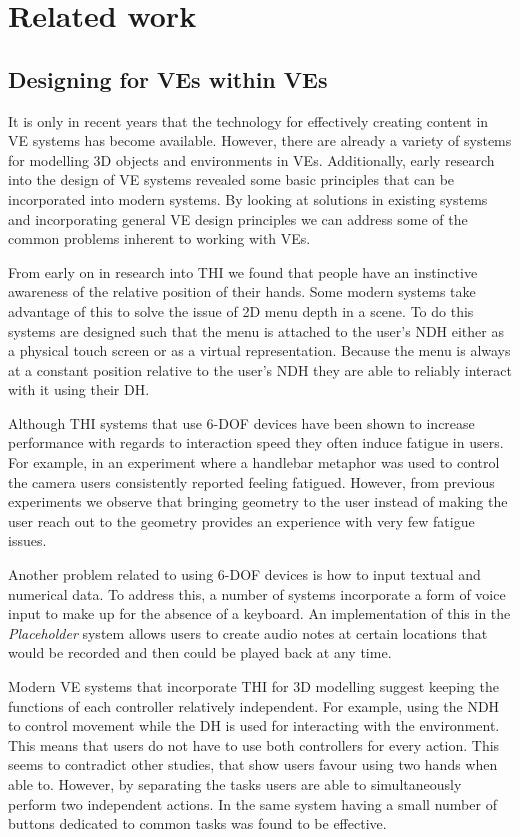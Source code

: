 \documentclass{sig-alternate-05-2015}
\begin{document}
\section{Related work}
\subsection{Designing for VEs within VEs}
It is only in recent years that the technology for effectively creating content in VE systems has become available. However, there are already a variety of systems for modelling 3D objects and environments in VEs. Additionally, early research into the design of VE systems revealed some basic principles that can be incorporated into modern systems. By looking at solutions in existing systems and incorporating general VE design principles we can address some of the common problems inherent to working with VEs.

From early on in research into THI we found that people have an instinctive awareness of the relative position of their hands\cite{Bowman1998, Buxton1986}. Some modern systems take advantage of this to solve the issue of 2D menu depth in a scene. To do this systems are designed such that the menu is attached to the user's NDH either as a physical touch screen\cite{Wang2013,Mine2014} or as a virtual representation\cite{Jerald2013}. Because the menu is always at a constant position relative to the user's NDH they are able to reliably interact with it using their DH.

Although THI systems that use 6-DOF devices have been shown to increase performance with regards to interaction speed\cite{Schultheis2012} they often induce fatigue in users. For example, in an experiment where a handlebar metaphor was used to control the camera users consistently reported feeling fatigued\cite{Song2012}. However, from previous experiments we observe that bringing geometry to the user instead of making the user reach out to the geometry provides an experience with very few fatigue issues\cite{Jerald2013}.

Another problem related to using 6-DOF devices is how to input textual and numerical data. To address this, a number of systems incorporate a form of voice input to make up for the absence of a keyboard\cite{Ponto2013,Toma2012}. An implementation of this in the \textit{Placeholder} system\cite{Laurel1994} allows users to create audio notes at certain locations that would be recorded and then could be played back at any time.

Modern VE systems that incorporate THI for 3D modelling suggest keeping the functions of each controller relatively independent\cite{Mine2014}. For example, using the NDH to control movement while the DH is used for interacting with the environment. This means that users do not have to use both controllers for every action. This seems to contradict other studies, that show users favour using two hands when able to\cite{Buxton1986,Hinckley1994}. However, by separating the tasks  users are able to simultaneously perform two independent actions.  In the same system having a small number of buttons dedicated to common tasks was found to be effective\cite{Mine2014}.
\end{document}
